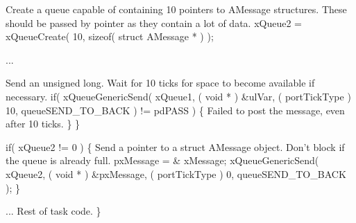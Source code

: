 \begin{DoxyPre}Create a queue capable of containing 10 pointers to AMessage structures.
These should be passed by pointer as they contain a lot of data.
        xQueue2 = xQueueCreate( 10, sizeof( struct AMessage * ) );\end{DoxyPre}



\begin{DoxyPre}...
\begin{DoxyVerb}    if( xQueue1 != 0 )
    {
\end{DoxyVerb}

Send an unsigned long.  Wait for 10 ticks for space to become
available if necessary.
                if( xQueueGenericSend( xQueue1, ( void * ) \&ulVar, ( portTickType ) 10, queueSEND\_TO\_BACK ) != pdPASS )
                \{
Failed to post the message, even after 10 ticks.
                \}
        \}\end{DoxyPre}



\begin{DoxyPre}        if( xQueue2 != 0 )
        \{
Send a pointer to a struct AMessage object.  Don't block if the
queue is already full.
                pxMessage = \& xMessage;
                xQueueGenericSend( xQueue2, ( void * ) \&pxMessage, ( portTickType ) 0, queueSEND\_TO\_BACK );
        \}\end{DoxyPre}



\begin{DoxyPre}... Rest of task code.
 \}
 \end{DoxyPre}
 